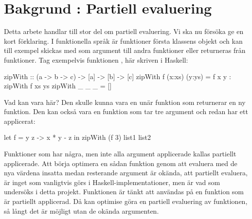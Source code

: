 \documentclass[Rapport]{subfiles}
\begin{document}
\begin{comment}

      ^
      |
ovan för olles text

Olles text rör ej :'/
För att kunna göra det här arbetet krävs det ett programmeringsspråk
att arbeta i. Vi har skapat en tolk efter STG, som är en modell för hur
ett funktionellt språk kan evalueras. Haskellkompilatorn GHC använder sig
till exempel av STG som ett steg i kompileringen. Ett program som representeras
med STG-kod är evalueringsvänligt, men inte särskilt programmerarvänligt,
varför vi också har skapat ett språk till - sockerspråket -
som är lättare att programmera i och mer liknar andra funktionella
språk som exempelvis Haskell. Sockerspråket kan sedan översättas till
STG-representationen och evalueras i tolken.

under olles text
       |
       V
\end{comment}

\section{Bakgrund : Partiell evaluering}
Detta arbete handlar till stor del om partiell evaluering. Vi ska nu försöka ge en kort förklaring. %
I funktionella språk är funktioner första klassens objekt och kan till exempel
skickas med som argument till andra funktioner eller returneras från funktioner. Tag exempelvis funktionen , här skriven i Haskell:

\begin{codeEx}
zipWith :: (a -> b -> c) -> [a] -> [b] -> [c]
zipWith f (x:xs) (y:ys) = f x y : zipWith f xs ys
zipWith _ _      _      = []
\end{codeEx}

Vad kan  vara här? Den skulle kunna vara en unär funktion som returnerar en ny
funktion. Den kan också vara en funktion som tar tre argument och redan har ett
applicerat:

\begin{codeEx}
let f = \x y z -> x * y - z
in  zipWith (f 3) list1 list2
\end{codeEx}


Funktioner som har några, men inte alla argument applicerade kallas 
partiellt applicerade. Att börja optimera en sådan funktion genom att evaluera med de nya värdena
insatta medan resterande argument är okända, att partiellt evaluera,
är inget som vanligtvis görs i Haskell-implementationer, 
men är vad som undersöks i detta projekt. Funktionen  är
tänkt att användas på en funktion som är partiellt applicerad. Då kan optimise göra en
partiell evaluering av funktionen, så långt det är möjligt utan de okända argumenten.
\end{document}
